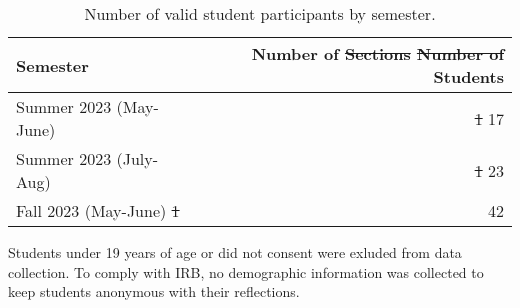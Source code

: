 \documentclass[
  12pt,
]{article}
\providecommand{\DIFdel}[1]{{\protect\color{red}\sout{#1}}}                      %
\providecommand{\DIFaddbegin}{} %
\providecommand{\DIFaddend}{} %
\providecommand{\DIFdelFL}[1]{\DIFdel{#1}} %
\providecommand{\DIFaddbeginFL}{} %
\providecommand{\DIFaddendFL}{} %
\providecommand{\DIFdelbeginFL}{} %
\providecommand{\DIFdelendFL}{} %
\newcommand{\DIFscaledelfig}{0.5}
\newlength{\DIFdelgraphicswidth} %
\newlength{\DIFdelgraphicsheight} %
\newcommand{\DIFaddincludegraphics}[2][]{{\color{blue}\fbox{\DIFOincludegraphics[#1]{#2}}}} %
\newcommand{\DIFdelincludegraphics}[2][]{%
\sbox{\DIFdelgraphicsbox}{\DIFOincludegraphics[#1]{#2}}%
\settoboxwidth{\DIFdelgraphicswidth}{\DIFdelgraphicsbox} %
\settoboxtotalheight{\DIFdelgraphicsheight}{\DIFdelgraphicsbox} %
\scalebox{\DIFscaledelfig}{%
\parbox[b]{\DIFdelgraphicswidth}{\usebox{\DIFdelgraphicsbox}\\[-\baselineskip] \rule{\DIFdelgraphicswidth}{0em}}\llap{\resizebox{\DIFdelgraphicswidth}{\DIFdelgraphicsheight}{%
\setlength{\unitlength}{\DIFdelgraphicswidth}%
\begin{picture}(1,1)%
\thicklines\linethickness{2pt} %
{\color[rgb]{1,0,0}\put(0,0){\framebox(1,1){}}}%
{\color[rgb]{1,0,0}\put(0,0){\line( 1,1){1}}}%
{\color[rgb]{1,0,0}\put(0,1){\line(1,-1){1}}}%
\end{picture}%
}\hspace*{3pt}}} %
} %
\DeclareRobustCommand{\DIFaddbegin}{\DIFOaddbegin \let\includegraphics\DIFaddincludegraphics} %
\DeclareRobustCommand{\DIFaddend}{\DIFOaddend \let\includegraphics\DIFOincludegraphics} %
\DeclareRobustCommand{\DIFaddbeginFL}{\DIFOaddbeginFL \let\includegraphics\DIFaddincludegraphics} %
\DeclareRobustCommand{\DIFaddendFL}{\DIFOaddendFL \let\includegraphics\DIFOincludegraphics} %
\DeclareRobustCommand{\DIFdelbeginFL}{\DIFOdelbeginFL \let\includegraphics\DIFdelincludegraphics} %
\DeclareRobustCommand{\DIFdelendFL}{\DIFOaddendFL \let\includegraphics\DIFOincludegraphics} %
\begin{document}
\DIFaddbegin \newpage

\DIFaddend \begin{table}[H]

\begin{threeparttable}
\caption{\label{tab:unnamed-chunk-5}Number of valid student participants by semester.}
\centering
\DIFdelbeginFL %
\DIFdelendFL \DIFaddbeginFL \begin{tabular}[t]{lr}
\DIFaddendFL \toprule
Semester & Number of \DIFdelbeginFL \DIFdelFL{Sections }%
\DIFdelFL{Number of }\DIFdelendFL Students\\
\midrule
Summer 2023 (May-June) & \DIFdelbeginFL \DIFdelFL{1 }%
\DIFdelendFL 17\\
Summer 2023 (July-Aug) & \DIFdelbeginFL \DIFdelFL{1 }%
\DIFdelendFL 23\\
Fall 2023 (May-June) \DIFdelbeginFL %
\DIFdelFL{1 }\DIFdelendFL & 42\\
\bottomrule
\end{tabular}
\begin{tablenotes}
\small
\item [] Students under 19 years of age or did not consent were exluded from data collection. To comply with IRB, no demographic information was collected to keep students anonymous with their reflections.
\end{tablenotes}
\end{threeparttable}
\end{table}
\end{document}
